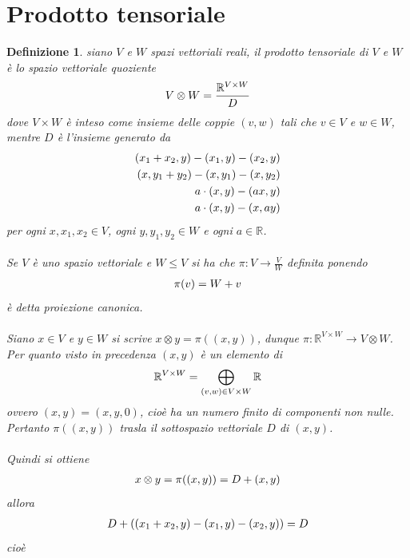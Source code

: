 \documentclass[oneside, 11pt]{amsbook}
\newcommand{\0}{{(0)}}
\newcommand{\3}{{(3)}}
\theoremstyle{colonplain}
\theoremstyle{colondefinition}
\newtheorem{defn}[thm]{Definizione}
\theoremstyle{colonremark}
\numberwithin{equation}{chapter}
\begin{document}
\section{Prodotto tensoriale}
\begin{defn} siano $V$ e $W$ spazi vettoriali reali, il prodotto tensoriale di $V$ e $W$ è lo spazio vettoriale quoziente
\begin{align}
    V \otimes W = \frac{\mathbb{R}^{V \times W}}{D} \notag
\end{align}
dove $V \times W$ è inteso come insieme delle coppie $(v, w)$ tali che $v \in V$ e $w \in W$, mentre $D$ è l'insieme generato da
\begin{align}
    (x_1 + x_2, y) - (x_1, y) - (x_2, y) \notag \\
    (x, y_1 + y_2) - (x, y_1) - (x, y_2) \notag \\
    a \cdot (x, y) - (ax, y) \notag \\
    a \cdot (x, y) - (x, ay) \notag
\end{align}
per ogni $x, x_1, x_2 \in V$, ogni $y, y_1, y_2 \in W$ e ogni $a \in \mathbb{R}$. \\ \\
Se $V$ è uno spazio vettoriale e $W \leq V$ si ha che $\pi : V \longrightarrow \frac{V}{W}$ definita ponendo
\begin{align}
    \pi(v) = W + v \notag
\end{align}
è detta \textit{proiezione canonica}. \\ \\
Siano $x \in V$ e $y \in W$ si scrive $x \otimes y = \pi ((x, y))$, dunque $\pi : \mathbb{R}^{V \times W} \longrightarrow V \otimes W$. \\
Per quanto visto in precedenza $(x, y)$ è un elemento di
\begin{align}
    \mathbb{R}^{V \times W} = \bigoplus_{(v, w) \in V \times W} \mathbb{R} \notag
\end{align}
ovvero $(x, y) = (x, y, 0)$, cioè ha un numero finito di componenti non nulle. Pertanto $\pi ((x, y))$ trasla il sottospazio vettoriale $D$ di $(x, y)$. \\ \\
Quindi si ottiene
\begin{align}
    x \otimes y = \pi((x, y)) = D + (x, y) \notag
\end{align}
allora
\begin{align}
    D + ((x_1 + x_2, y) - (x_1, y) - (x_2, y)) = D \notag
\end{align}
cioè
\begin{align}

\end{align}
\end{defn}
\end{document}
